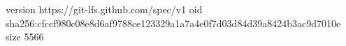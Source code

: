 version https://git-lfs.github.com/spec/v1
oid sha256:cfccf980c08e8d6af9788ce123329a1a7a4e0f7d03d84d39a8424b3ac9d7010e
size 5566
